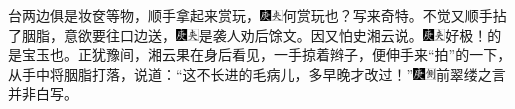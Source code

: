 台两边俱是妆奁等物，顺手拿起来赏玩，{\includegraphics[width=3mm]{../Images/00004}\includegraphics[width=3mm]{../Images/00012}\footnotesize \kaishu 何赏玩也？写来奇特。}不觉又顺手拈了胭脂，意欲要往口边送，{\includegraphics[width=3mm]{../Images/00004}\includegraphics[width=3mm]{../Images/00012}\footnotesize \kaishu 是袭人劝后馀文。}因又怕史湘云说。{\includegraphics[width=3mm]{../Images/00004}\includegraphics[width=3mm]{../Images/00012}\footnotesize \kaishu 好极！的是宝玉也。}正犹豫间，湘云果在身后看见，一手掠着辫子，便伸手来“拍”的一下，从手中将胭脂打落，说道：“这不长进的毛病儿，多早晚才改过！”{\includegraphics[width=3mm]{../Images/00004}\includegraphics[width=3mm]{../Images/00011}\footnotesize \kaishu 前翠缕之言并非白写。}

